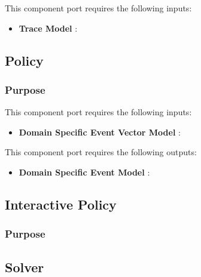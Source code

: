 \documentclass{gemoc} %
\begin{document}
This component port requires the following inputs:
\begin{itemize}
  \item \textbf{Trace Model} :
\end{itemize}


\subsection{Policy}


\subsubsection{Purpose}

This component port requires the following inputs:
\begin{itemize}
  \item \textbf{Domain Specific Event Vector Model} :
\end{itemize}

This component port requires the following outputs:
\begin{itemize}
  \item \textbf{Domain Specific Event Model} :
\end{itemize}

\subsection{Interactive Policy}


\subsubsection{Purpose}



\subsection{Solver}
\end{document}
